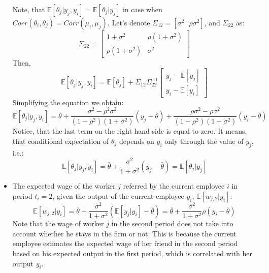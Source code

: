 \documentclass[12pt]{article}
\begin{document}
\begin{itemize}
    Note, that $\mathbb{E}[\theta_j|y_j,y_i] = \mathbb{E}[\theta_j|y_j]$ in case when $Corr(\theta_i,\theta_j)= Corr(\mu_i,\mu_j)$. Let's denote $\Sigma_{12} = [\sigma^2 \text{    } \rho\sigma^2]$, and $\Sigma_{22}$ as:
    \begin{equation*}
        \Sigma_{22} = 
        \begin{bmatrix}
        1+\sigma^2 & \rho (1+\sigma^2)\\
        \rho (1+\sigma^2)& \sigma^2
        \end{bmatrix}
    \end{equation*}
    Then, 
    \begin{equation*}
    \mathbb{E}[\theta_j|y_j,y_i] = \mathbb{E}[\theta_j]+ \Sigma_{12}\Sigma_{22}^{-1}
    \begin{bmatrix}
        y_j-\mathbb{E}[y_j]\\
        y_i-\mathbb{E}[y_i]
    \end{bmatrix}
    \end{equation*}
    Simplifying the equation we obtain:
    \begin{equation*}
        \mathbb{E}[\theta_j|y_j,y_i] = \bar{\theta}+ \frac{\sigma^2-\rho^2\sigma^2}{(1-\rho^2)(1+\sigma^2)}(y_j - \bar{\theta})+ \frac{\rho\sigma^2-\rho\sigma^2}{(1-\rho^2)(1+\sigma^2)}(y_i - \bar{\theta})
    \end{equation*}
    Notice, that the last term on the right hand side is equal to zero. It means, that conditional expectation of $\theta_j$ depends on $y_i$ only through the value of $y_j$, i.e.:
    \begin{equation*}
        \mathbb{E}[\theta_j|y_j,y_i] = \bar{\theta}+\frac{\sigma^2}{1+\sigma^2}(y_j - \bar{\theta}) = \mathbb{E}[\theta_j|y_j]
    \end{equation*}
    
    \item The expected wage of the worker $j$ referred by the current employee $i$ in period $t_i = 2$, given the output of the current employee $y_i$, $\mathbb{E}[w_{j,2}|y_i]$:
    \begin{equation}\label{eq:w_j_2_cond_y_i}
       \mathbb{E}[w_{j,2}|y_i] =  \bar{\theta}+\frac{\sigma^2}{1+\sigma^2}(\mathbb{E}[y_j | y_i] - \bar{\theta}) = \bar{\theta}+\frac{\sigma^2}{1+\sigma^2}\rho(y_i-\bar{\theta})
    \end{equation}
    Note that the wage of worker $j$ in the second period does not take into account whether he stays in the firm or not.  This is because the current employee estimates the expected wage of her friend in the second period based on his expected output in the first period, which is correlated with her output $y_i$. %


\end{itemize}
\end{document}
